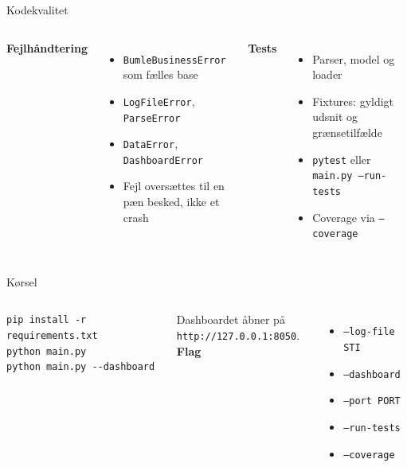 \documentclass[aspectratio=169,10pt]{beamer}
\newcommand{\code}[1]{\texttt{\small #1}}
\begin{document}
\begin{frame}{Kodekvalitet}
  \begin{columns}[T]
      \textbf{Fejlhåndtering}
      \vspace{0.3em}
      \begin{itemize}
        \item \code{BumleBusinessError} som fælles base
        \item \code{LogFileError}, \code{ParseError}
        \item \code{DataError}, \code{DashboardError}
        \item Fejl oversættes til en pæn besked, ikke et crash
      \end{itemize}
      \textbf{Tests}
      \vspace{0.3em}
      \begin{itemize}
        \item Parser, model og loader
        \item Fixtures: gyldigt udsnit og grænsetilfælde
        \item \code{pytest} eller \code{main.py --run-tests}
        \item Coverage via \code{--coverage}
      \end{itemize}
  \end{columns}
\end{frame}

\begin{frame}[fragile]{Kørsel}
  \begin{columns}[T]
\begin{verbatim}
pip install -r requirements.txt
python main.py
python main.py --dashboard
\end{verbatim}
      \vspace{0.4em}
      {\footnotesize\color{muted}Dashboardet åbner på \\\code{http://127.0.0.1:8050}.}
      \textbf{Flag}
      \vspace{0.3em}
      \begin{itemize}
        \item \code{--log-file STI}
        \item \code{--dashboard}
        \item \code{--port PORT}
        \item \code{--run-tests}
        \item \code{--coverage}
      \end{itemize}
  \end{columns}
\end{frame}
\end{document}
